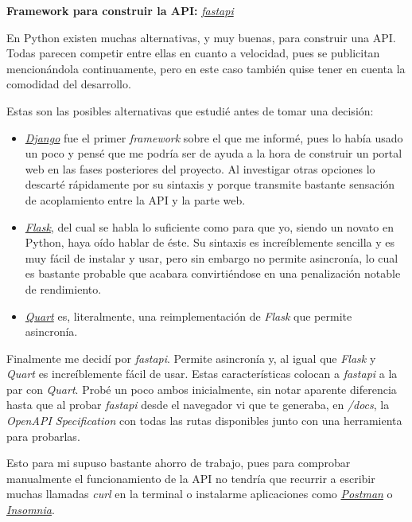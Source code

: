 \textbf{Framework para construir la API:} \href{https://fastapi.tiangolo.com/}{\textit{fastapi}}

En Python existen muchas alternativas, y muy buenas, para construir una API. Todas parecen competir entre ellas en cuanto a velocidad, pues se publicitan mencionándola continuamente, pero en este caso también quise tener en cuenta la comodidad del desarrollo.

Estas son las posibles alternativas que estudié antes de tomar una decisión:
\begin{itemize}
    \item \href{https://www.djangoproject.com/}{\textit{Django}} fue el primer \textit{framework} sobre el que me informé, pues lo había usado un poco y pensé que me podría ser de ayuda a la hora de construir un portal web en las fases posteriores del proyecto. Al investigar otras opciones lo descarté rápidamente por su sintaxis y porque transmite bastante sensación de acoplamiento entre la API y la parte web.
    \item \href{https://flask.palletsprojects.com/en/2.2.x/}{\textit{Flask}}, del cual se habla lo suficiente como para que yo, siendo un novato en Python, haya oído hablar de éste. Su sintaxis es increíblemente sencilla y es muy fácil de instalar y usar, pero sin embargo no permite asincronía, lo cual es bastante probable que acabara convirtiéndose en una penalización notable de rendimiento.
    \item \href{https://quart.palletsprojects.com/en/latest/}{\textit{Quart}} es, literalmente, una reimplementación de \textit{Flask} que permite asincronía.
\end{itemize}

Finalmente me decidí por \textit{fastapi}. Permite asincronía y, al igual que \textit{Flask} y \textit{Quart} es increíblemente fácil de usar. Estas características colocan a \textit{fastapi} a la par con \textit{Quart}. Probé un poco ambos inicialmente, sin notar aparente diferencia hasta que al probar \textit{fastapi} desde el navegador vi que te generaba, en \textit{/docs}, la \textit{OpenAPI Specification} con todas las rutas disponibles junto con una herramienta para probarlas.

Esto para mi supuso bastante ahorro de trabajo, pues para comprobar manualmente el funcionamiento de la API no tendría que recurrir a escribir muchas llamadas \textit{curl} en la terminal o instalarme aplicaciones como \href{https://www.postman.com/}{\textit{Postman}} o \href{https://insomnia.rest/}{\textit{Insomnia}}.

